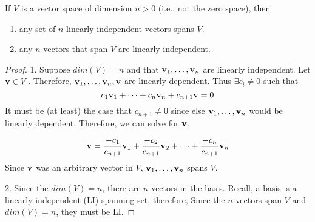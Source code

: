 \begin{theorem}
If $V$ is a vector space of dimension $n>0$ (i.e., not the zero space), then

\begin{enumerate}
	\item any set of $n$ linearly independent vectors spans $V$.
	\item any $n$ vectors that span $V$  are linearly independent.
\end{enumerate}

\begin{proof}
1.  Suppose $dim(V) = n$ and that ${\bf v}_1, \dots, {\bf v}_n$ are linearly independent.  Let ${\bf v} \in V$.   Therefore, ${\bf v}_1, \dots, {\bf v}_n, {\bf v}$ are linearly dependent.  Thus $\exists c_i \ne 0$ such that 
\[  c_1 {\bf v}_1 + \cdots + c_n {\bf v}_n + c_{n+1} {\bf v} = 0 \]
It must be (at least)  the case that $c_{n+1} \ne 0$ since else $ {\bf v}_1, \dots, {\bf v}_n$ would be linearly dependent.  Therefore, we can solve for ${\bf v}$, 

\[ {\bf v} = \frac{-c_1}{c_{n+1}} {\bf v}_1 + \frac{-c_2}{c_{n+1}} {\bf v}_2 + \cdots + \frac{-c_n}{c_{n+1}} {\bf v}_n  \]
Since ${\bf v}$ was an arbitrary vector in $V$, ${\bf v}_1, \dots, {\bf v}_n$ spans $V$.



2.  Since the $dim(V) = n$, there are $n$ vectors in the basis.  Recall, a basis is a linearly independent (LI) spanning set, therefore, Since the $n$ vectors span $V$ and $dim(V) = n$, they must be LI.


\end{proof}


\end{theorem}
















